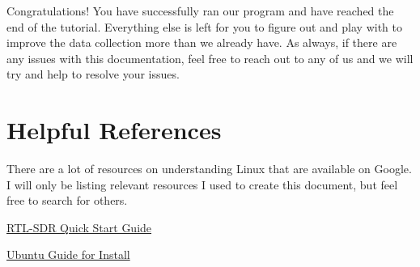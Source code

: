 \documentclass[letterpaper,12pt,notitlepage]{report} %
\begin{document}
Congratulations! You have successfully ran our program and have reached the end of the tutorial. Everything else is left for you to figure out and play with to improve the data collection more than we already have. As always, if there are any issues with this documentation, feel free to reach out to any of us and we will try and help to resolve your issues. 

\section{Helpful References}
There are a lot of resources on understanding Linux that are available on Google. I will only be listing relevant resources I used to create this document, but feel free to search for others.

\href{https://ranous.files.wordpress.com/2020/05/rtl-sdr4linux_quickstartguidev20.pdf}{RTL-SDR Quick Start Guide}

\href{https://ubuntu.com/tutorials/how-to-install-ubuntu-desktop-on-raspberry-pi-4#1-overview}{Ubuntu Guide for Install}
\end{document}
